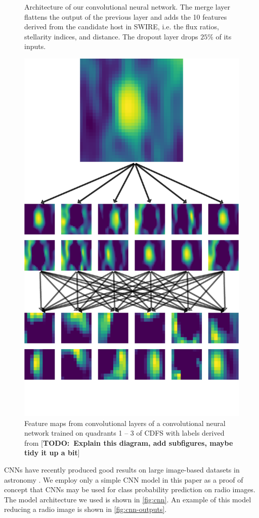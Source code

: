 \documentclass[fleqn,usenatbib,usedcolumn]{mnras}
\newcommand{\todo}[1]{ {\color{red}[{\bf TODO:~{#1}}]} }
\begin{document}
\begin{figure}
        \caption{Architecture of our convolutional neural network. The merge
          layer flattens the output of the previous layer and adds the 10
          features derived from the candidate host in SWIRE, i.e. the flux
          ratios, stellarity indices, and distance. The dropout layer drops
          $25\%$ of its inputs.}
        \label{fig:cnn}
      \end{figure}

      \begin{figure}
      \centering
      \includegraphics[width=0.6\columnwidth]{convolutions_42191.pdf}
      \caption{Feature maps from convolutional layers of a convolutional neural
        network trained on quadrants 1 -- 3 of CDFS with labels derived from
        \citeauthor{norris06} \todo{Explain this diagram, add subfigures, maybe tidy it up a bit}}
      \label{fig:cnn-outputs}
      \end{figure}

      CNNs have recently produced good results on large image-based datasets in
      astronomy \citep[e.g.][]{dieleman15cnn, lukic17compact}. We employ only a
      simple CNN model in this paper as a proof of concept that CNNs may be used
      for class probability prediction on radio images. The model architecture
      we used is shown in \autoref{fig:cnn}. An example of this model reducing a
      radio image is shown in \autoref{fig:cnn-outputs}.
\end{document}
